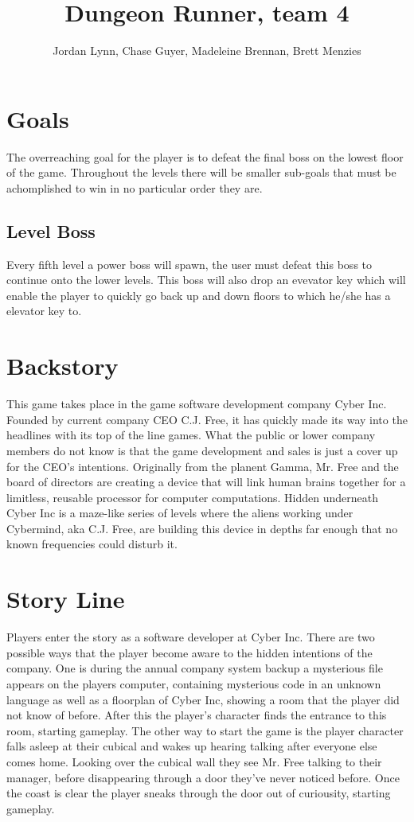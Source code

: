 \documentclass[11pt]{article}
\title{Dungeon Runner, team 4}
\author{Jordan Lynn, Chase Guyer, Madeleine Brennan, Brett Menzies}
\begin{document}
    \maketitle

    \section{Goals}
    The overreaching goal for the player is to defeat the final boss on the lowest floor of the game. Throughout the levels there will be smaller sub-goals that must be achomplished to win in no particular order they are.
        \subsection{Level Boss}
            Every fifth level a power boss will spawn, the user must defeat this boss to continue onto the lower levels. This boss will also drop an evevator key which will enable the player to quickly go back up and down floors to which he/she has a elevator key to.
    
    \section{Backstory}
    This game takes place in the game software development company Cyber Inc. Founded by current company CEO C.J. Free, it has quickly made its way into the headlines with its top of the line games. What the public or lower company members do not know is that the game development and sales is just a cover up for the CEO's intentions. Originally from the planent Gamma, Mr. Free and the board of directors are creating a device that will link human brains together for a limitless, reusable processor for computer computations. Hidden underneath Cyber Inc is a maze-like series of levels where the aliens working under Cybermind, aka C.J. Free, are building this device in depths far enough that no known frequencies could disturb it. 

    \section{Story Line}
    Players enter the story as a software developer at Cyber Inc. There are two possible ways that the player become aware to the hidden intentions of the company. One is during the annual company system backup a mysterious file appears on the players computer, containing mysterious code in an unknown language as well as a floorplan of Cyber Inc, showing a room that the player did not know of before. After this the player's character finds the entrance to this room, starting gameplay. The other way to start the game is the player character falls asleep at their cubical and wakes up hearing talking after everyone else comes home. Looking over the cubical wall they see Mr. Free talking to their manager, before disappearing through a door they've never noticed before. Once the coast is clear the player sneaks through the door out of curiousity, starting gameplay.
\end{document}
